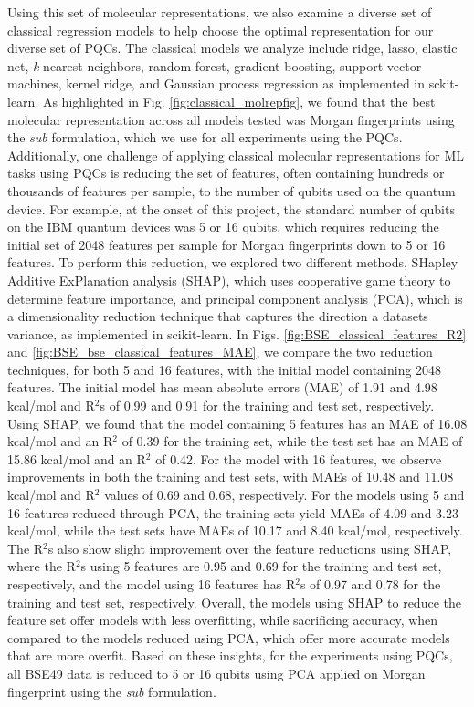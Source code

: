 \documentclass[journal=jacsat,manuscript=article]{achemso}
\begin{document}
Using this set of molecular representations, we also examine a diverse set of classical regression models to help choose the optimal representation for our diverse set of PQCs.
The classical models we analyze include ridge, lasso, elastic net, \textit{k}-nearest-neighbors, random forest, gradient boosting, support vector machines, kernel ridge, and Gaussian process regression as implemented in sckit-learn.\cite{pedregosa_scikit-learn_2011}
As highlighted in Fig. \ref{fig:classical_molrepfig}, we found that the best molecular representation across all models tested was Morgan fingerprints using the \textit{sub} formulation, which we use for all experiments using the PQCs.
Additionally, one challenge of applying classical molecular representations for ML tasks using PQCs is reducing the set of features, often containing hundreds or thousands of features per sample, to the number of qubits used on the quantum device.
For example, at the onset of this project, the standard number of qubits on the IBM quantum devices was 5 or 16 qubits, which requires reducing the initial set of 2048 features per sample for Morgan fingerprints down to 5 or 16 features.
To perform this reduction, we explored two different methods, SHapley Additive ExPlanation analysis (SHAP)\cite{lundberg_unified_2017}, which uses cooperative game theory to determine feature importance, and principal component analysis (PCA), which is a dimensionality reduction technique that captures the direction a datasets variance, as implemented in scikit-learn.\cite{pedregosa_scikit-learn_2011}
In Figs. \ref{fig:BSE_classical_features_R2} and \ref{fig:BSE_bse_classical_features_MAE}, we compare the two reduction techniques, for both 5 and 16 features, with the initial model containing 2048 features.
The initial model has mean absolute errors (MAE) of 1.91 and 4.98 kcal/mol and R$^{2}$s of 0.99 and 0.91 for the training and test set, respectively.
Using SHAP, we found that the model containing 5 features has an MAE of 16.08 kcal/mol and an R$^{2}$ of 0.39 for the training set, while the test set has an MAE of 15.86 kcal/mol and an R$^{2}$ of 0.42.
For the model with 16 features, we observe improvements in both the training and test sets, with MAEs of 10.48 and 11.08 kcal/mol and R$^{2}$ values of 0.69 and 0.68, respectively.
For the models using 5 and 16 features reduced through PCA, the training sets yield MAEs of 4.09 and 3.23 kcal/mol, while the test sets have MAEs of 10.17 and 8.40 kcal/mol, respectively.
The R$^{2}$s also show slight improvement over the feature reductions using SHAP, where the R$^{2}$s using 5 features are 0.95 and 0.69 for the training and test set, respectively, and the model using 16 features has R$^{2}$s of 0.97 and 0.78 for the training and test set, respectively.
Overall, the models using SHAP to reduce the feature set offer models with less overfitting, while sacrificing accuracy, when compared to the models reduced using PCA, which offer more accurate models that are more overfit. 
Based on these insights, for the experiments using PQCs, all BSE49 data is reduced to 5 or 16 qubits using PCA applied on Morgan fingerprint using the \textit{sub} formulation.
\end{document}
